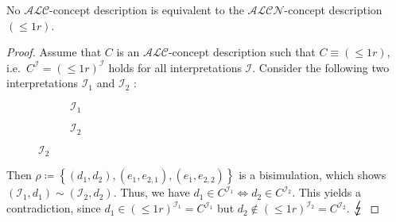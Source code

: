 \begin{prop}
	No $\mathcal{ALC}$-concept description is equivalent to the $\mathcal{ALCN}$-concept description $\left( \leq 1 r \right)$.
\end{prop}
\begin{proof}
	Assume that $C$ is an $\mathcal{ALC}$-concept description such that $C \equiv ( \leq 1 r )$, i.e.\ $C^{\mathcal{I}} = \left( \leq 1 r \right)^\mathcal{I}$ holds for all interpretations $\mathcal{I}$.
	Consider the following two interpretations $\mathcal{I}_1$ and $\mathcal{I}_2$ :
	\begin{figure}[H]
		\centering
		\begin{subfigure}[t]{.475\textwidth}
			\centering
			\caption{$\mathcal{I}_1$}
		\end{subfigure}
		\hfill
		\begin{subfigure}[t]{.475\textwidth}
			\centering
			\caption{$\mathcal{I}_2$}
		\end{subfigure}
	\end{figure}
	Then $\rho \coloneqq \left\{ (d_1,d_2), (e_1,e_{2,1}), (e_1,e_{2,2}) \right\}$ is a bisimulation, which shows $(\mathcal{I}_1, d_1) \sim (\mathcal{I}_2,d_2)$.
	Thus, we have $d_1 \in C^{\mathcal{I}_1} \iff d_2 \in C^{\mathcal{I}_2}$.
	This yields a contradiction, since $d_1 \in ( \leq 1r)^{\mathcal{I}_1} = C^{\mathcal{I}_1}$ but $d_2 \notin ( \leq 1r)^{\mathcal{I}_2} = C^{\mathcal{I}_2}$. $\contra$
\end{proof}

